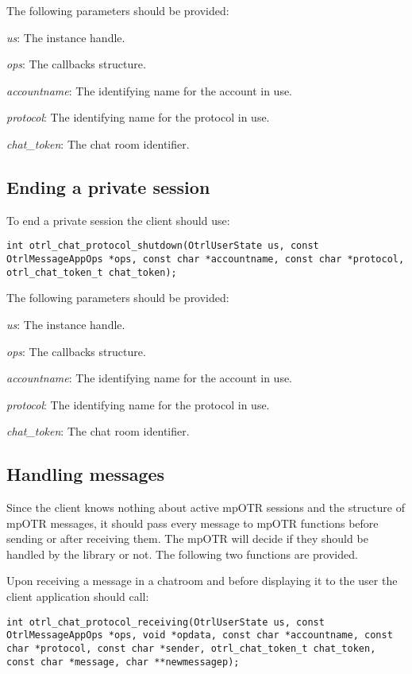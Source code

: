 The following parameters should be provided:
\begin{description}
  \item \emph{us}: The instance handle.
  \item \emph{ops}: The callbacks structure.
  \item \emph{accountname}: The identifying name for the account in use.
  \item \emph{protocol}: The identifying name for the protocol in use.
  \item \emph{chat\_token}: The chat room identifier.
\end{description}

\subsection{Ending a private session}
To end a private session the client should use:
\begin{lstlisting}[caption={The private session ending function}]
int otrl_chat_protocol_shutdown(OtrlUserState us, const OtrlMessageAppOps *ops, const char *accountname, const char *protocol, otrl_chat_token_t chat_token);
\end{lstlisting}

The following parameters should be provided:
\begin{description}
  \item \emph{us}: The instance handle.
  \item \emph{ops}: The callbacks structure.
  \item \emph{accountname}: The identifying name for the account in use.
  \item \emph{protocol}: The identifying name for the protocol in use.
  \item \emph{chat\_token}: The chat room identifier.
\end{description}

\subsection{Handling messages}
Since the client knows nothing about active mpOTR sessions and the structure of mpOTR messages, it should pass every message to mpOTR functions before sending or after receiving them. The mpOTR will decide if they should be handled by the library or not. The following two functions are provided. 

Upon receiving a message in a chatroom and before displaying it to the user the client application should call:
\begin{lstlisting}[caption={The received messages handling function}]
int otrl_chat_protocol_receiving(OtrlUserState us, const OtrlMessageAppOps *ops, void *opdata, const char *accountname, const char *protocol, const char *sender, otrl_chat_token_t chat_token, const char *message, char **newmessagep);
\end{lstlisting}

